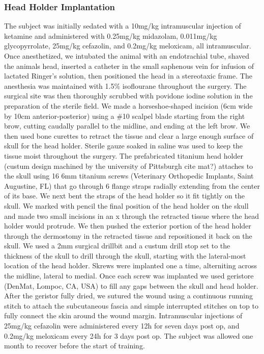 \subsubsection*{Head Holder Implantation} The subject was initially sedated with a 10mg/kg intramuscular injection of ketamine and administered with 0.25mg/kg midazolam, 0.011mg/kg glycopyrrolate, 25mg/kg cefazolin, and 0.2mg/kg meloxicam, all intramuscular. Once anesthetized, we intubated the animal with an endotrachial tube, shaved the animals head, inserted a catheter in the small saphenous vein for infusion of lactated Ringer's solution, then positioned the head in a stereotaxic frame. The anesthesia was maintained with 1.5\% isoflourane throughout the surgery. The surgical site was then thoroughly scrubbed with povidone iodine solution in the preparation of the sterile field. We made a horseshoe-shaped incision (6cm wide by 10cm anterior-posterior) using a \#10 scalpel blade starting from the right brow, cutting caudally parallel to the midline, and ending at the left brow. We then used bone curettes to retract the tissue and clear a large enough surface of skull for the head holder. Sterile gauze soaked in saline was used to keep the tissue moist throughout the surgery. The prefabricated titanium head holder (custum design machined by the university of Pittsburgh cite mat?) attaches to the skull using 16 6mm titanium screws (Veterinary Orthopedic Implants, Saint Augustine, FL) that go through 6 flange straps radially extending from the center of its base. We next bent the straps of the head holder so it fit tightly on the skull. We marked with pencil the final position of the head holder on the skull and made two small incisions in an x through the retracted tissue where the head holder would protrude. We then pushed the exterior portion of the head holder through the dermostomy in the retracted tissue and repositioned it back on the skull. We used a 2mm surgical drillbit and a custum drill stop set to the thickness of the skull to drill through the skull, starting with the lateral-most location of the head holder. Skrews were implanted one a time, alterniting across the midline, lateral to medial. Once each screw was implanted we used geristore (DenMat, Lompoc, CA, USA) to fill any gaps between the skull and head holder. After the geristor fully dried, we sutured the wound using a continuous running stitch to attach the subcutaneous fascia and simple interrupted stitches on top to fully connect the skin around the wound margin. Intramuscular injections of 25mg/kg cefazolin were administered every 12h for seven days post op, and 0.2mg/kg meloxicam every 24h for 3 days post op. The subject was allowed one month to recover before the start of training.

